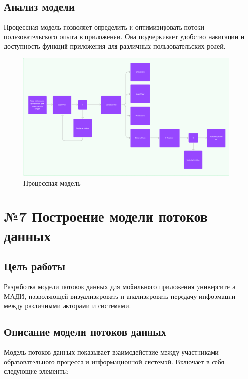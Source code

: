 \documentclass[a4paper,12pt]{article}
\begin{document}
\subsection{Анализ модели}
Процессная модель позволяет определить и оптимизировать потоки пользовательского опыта в приложении. Она подчеркивает удобство навигации и доступность функций приложения для различных пользовательских ролей.

\begin{figure}[-h]
    \centering
    \includegraphics[width=1\linewidth]{processModel.png}
    \caption{Процессная модель}
    
\end{figure}

\section{№7 Построение модели потоков данных}

\subsection{Цель работы}
Разработка модели потоков данных для мобильного приложения университета МАДИ, позволяющей визуализировать и анализировать передачу информации между различными акторами и системами.

\subsection{Описание модели потоков данных}
Модель потоков данных показывает взаимодействие между участниками образовательного процесса и информационной системой. Включает в себя следующие элементы:
\end{document}
